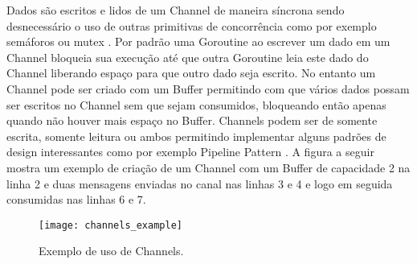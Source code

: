Dados são escritos e lidos de um Channel de maneira síncrona sendo desnecessário o uso de outras primitivas de concorrência como por exemplo semáforos ou mutex \cite{paper:concurrency:schmidt}. Por padrão uma Goroutine ao escrever um dado em um Channel bloqueia sua execução até que outra Goroutine leia este dado do Channel liberando espaço para que outro dado seja escrito. No entanto um Channel pode ser criado com um Buffer permitindo com que vários dados possam ser escritos no Channel sem que sejam consumidos, bloqueando então apenas quando não houver mais espaço no Buffer. Channels podem ser de somente escrita, somente leitura ou ambos permitindo implementar alguns padrões de design interessantes como por exemplo Pipeline Pattern \cite{docs:golang:pipeline_pattern}. A figura a seguir mostra um exemplo de criação de um Channel com um Buffer de capacidade 2 na linha 2 e duas mensagens enviadas no canal nas linhas 3 e 4 e logo em seguida consumidas nas linhas 6 e 7. 

\begin{figure}[H]
  \texttt{[image: channels\_example]}
  \centering
  \caption{Exemplo de uso de Channels.}
  \label{code:channels:example}
\end{figure}
